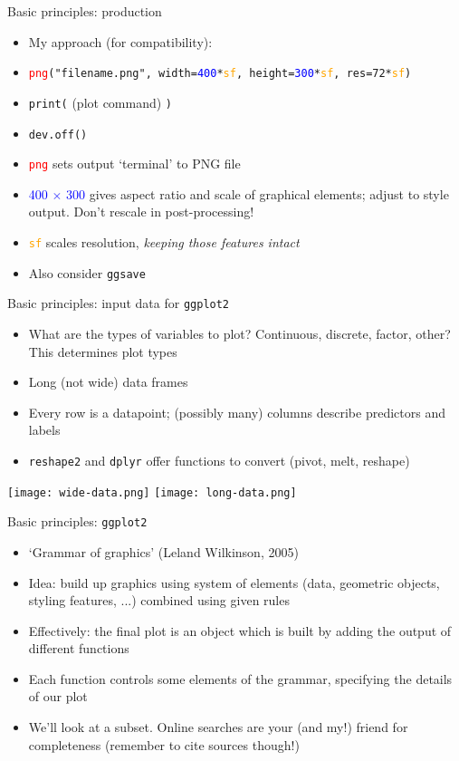 \documentclass[10pt]{beamer}
\begin{document}
\begin{frame}{Basic principles: production}
    \begin{itemize}
    \item My approach (for compatibility):
    \item[] \texttt{\textcolor{red}{png}("filename.png", width=\textcolor{blue}{400}*\textcolor{orange}{sf}, height=\textcolor{blue}{300}*\textcolor{orange}{sf}, res=72*\textcolor{orange}{sf})}
      \item[] \texttt{print(} (plot command) \texttt{)}
      \item[] \texttt{dev.off()}
      \item \texttt{\textcolor{red}{png}} sets output `terminal' to PNG file
      \item \textcolor{blue}{400 $\times$ 300} gives aspect ratio and scale of graphical elements; adjust to style output. Don't rescale in post-processing!
      \item \texttt{\textcolor{orange}{sf}} scales resolution, \emph{keeping those features intact}
        \item Also consider \texttt{ggsave}
  \end{itemize}
\end{frame}


\begin{frame}{Basic principles: input data for \texttt{ggplot2}}
  \begin{itemize}
        \item What are the types of variables to plot? Continuous, discrete, factor, other? This determines plot types
    \item Long (not wide) data frames
      \item Every row is a datapoint; (possibly many) columns describe predictors and labels
    \item \texttt{reshape2} and \texttt{dplyr} offer functions to convert (pivot, melt, reshape)
    \end{itemize}
    \texttt{[image: wide-data.png]}     \texttt{[image: long-data.png]} \\
\end{frame}

\begin{frame}{Basic principles: \texttt{ggplot2}}
    \begin{itemize}
    \item `Grammar of graphics' (Leland Wilkinson, 2005)
    \item Idea: build up graphics using system of elements (data, geometric objects, styling features, ...) combined using given rules
    \item Effectively: the final plot is an object which is built by adding the output of different functions
    \item Each function controls some elements of the grammar, specifying the details of our plot
      \item We'll look at a subset. Online searches are your (and my!) friend for completeness (remember to cite sources though!)
    \end{itemize}
\end{frame}
\end{document}
